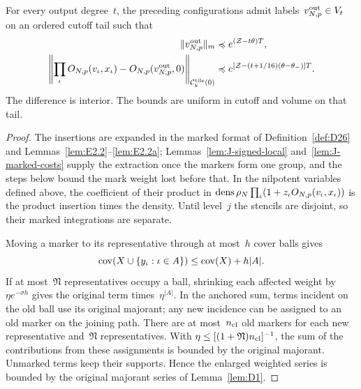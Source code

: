 \begin{lemma}\label{lem:J-lattice}
For every output degree~$t$, the preceding configurations admit labels~$v_{N,p}^{\rm out}\in V_t$ on an ordered cutoff tail such that
\begin{align*}
\|v_{N,p}^{\rm out}\|_m&\preccurlyeq e^{(\mathcal Z-t\theta)T},\\
\left\|\prod_\iota O_{N,p}(v_\iota,x_\iota)-O_{N,p}(v_{N,p}^{\rm out},0)\right\|_{\mathcal C^{\rm tile}_k(0)}
&\preccurlyeq e^{[\mathcal Z-(t+1/16)(\theta-\theta_-)]T}.
\end{align*}
The difference is interior. The bounds are uniform in cutoff and volume on that tail.
\end{lemma}
\begin{proof}\label{proof:J-lattice-start}
The insertions are expanded in the marked format of Definition~\ref{def:D26} and Lemmas~\ref{lem:E2.2}--\ref{lem:E2.2a}; Lemmas~\ref{lem:J-signed-local} and~\ref{lem:J-marked-costs} supply the extraction once the markers form one group, and the steps below bound the mark weight lost before that. In the nilpotent variables defined above, the coefficient of their product in $\operatorname{dens}\rho_N\prod_\iota(1+z_\iota O_{N,p}(v_\iota,x_\iota))$ is the product insertion times the density. Until level~$j$ the stencils are disjoint, so their marked integrations are separate.

Moving a marker to its representative through at most~$h$ cover balls gives
\begin{equation}\label{eq:J-support-move}
\operatorname{cov}(X\cup\{y_\iota:\iota\in A\})\le\operatorname{cov}(X)+h|A|.
\end{equation}
If at most~$\mathfrak N$ representatives occupy a ball, shrinking each affected weight by $\eta e^{-\sigma h}$ gives the original term times~$\eta^{|A|}$. In the anchored sum, terms incident on the old ball use its original majorant; any new incidence can be assigned to an old marker on the joining path. There are at most~$n_{\rm cl}$ old markers for each new representative and~$\mathfrak N$ representatives. With $\eta\le[(1+\mathfrak N)n_{\rm cl}]^{-1}$, the sum of the contributions from these assignments is bounded by the original majorant. Unmarked terms keep their supports. Hence the enlarged weighted series is bounded by the original majorant series of Lemma~\ref{lem:D1}.


\end{proof}
